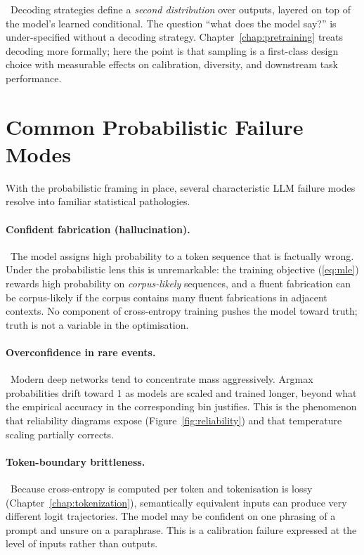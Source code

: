 \Cons\ Decoding strategies define a \emph{second distribution} over
outputs, layered on top of the model's learned conditional. The
question ``what does the model say?'' is under-specified without a
decoding strategy. Chapter~\ref{chap:pretraining} treats decoding more formally; here the
point is that sampling is a first-class design choice with measurable
effects on calibration, diversity, and downstream task performance.

\section{Common Probabilistic Failure Modes}

With the probabilistic framing in place, several characteristic LLM failure modes resolve into familiar statistical pathologies.

\paragraph{Confident fabrication (hallucination).}
\Emp\ The model assigns high probability to a token sequence that is
factually wrong. Under the probabilistic lens this is unremarkable: the
training objective (\ref{eq:mle}) rewards high probability on
\emph{corpus-likely} sequences, and a fluent fabrication can be
corpus-likely if the corpus contains many fluent fabrications in
adjacent contexts. No component of cross-entropy training pushes the
model toward truth; truth is not a variable in the optimisation.

\paragraph{Overconfidence in rare events.}
\Emp\ Modern deep networks tend to concentrate mass aggressively. Argmax
probabilities drift toward 1 as models are scaled and trained longer,
beyond what the empirical accuracy in the corresponding bin justifies.
This is the phenomenon that reliability diagrams expose
(Figure~\ref{fig:reliability}) and that temperature scaling partially
corrects.

\paragraph{Token-boundary brittleness.}
\Emp\ Because cross-entropy is computed per token and tokenisation is
lossy (Chapter~\ref{chap:tokenization}), semantically equivalent inputs can produce very
different logit trajectories. The model may be confident on one phrasing
of a prompt and unsure on a paraphrase. This is a calibration failure
expressed at the level of inputs rather than outputs.


